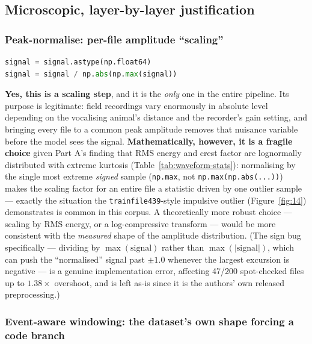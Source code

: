 \documentclass[11pt]{article}
\begin{document}
\subsection{Microscopic, layer-by-layer justification}
\label{sec:B3}

\subsubsection{Peak-normalise: per-file amplitude ``scaling''}
\label{sec:B31}

\begin{lstlisting}[language=Python]
signal = signal.astype(np.float64)
signal = signal / np.abs(np.max(signal))
\end{lstlisting}

\textbf{Yes, this is a scaling step}, and it is the \emph{only} one in the
entire pipeline. Its purpose is legitimate: field recordings vary enormously
in absolute level depending on the vocalising animal's distance and the
recorder's gain setting, and bringing every file to a common peak amplitude
removes that nuisance variable before the model sees the signal.
\textbf{Mathematically, however, it is a fragile choice} given Part A's
finding that RMS energy and crest factor are lognormally distributed with
extreme kurtosis (Table~\ref{tab:waveform-stats}): normalising by the single
most extreme \emph{signed} sample (\texttt{np.max}, not
\texttt{np.max(np.abs(...))}) makes the scaling factor for an entire file a
statistic driven by one outlier sample --- exactly the situation the
\texttt{trainfile439}-style impulsive outlier (Figure~\ref{fig:14})
demonstrates is common in this corpus. A theoretically more robust choice
--- scaling by RMS energy, or a log-compressive transform --- would be more
consistent with the \emph{measured} shape of the amplitude distribution.
(The sign bug specifically --- dividing by $\max(\text{signal})$ rather than
$\max(|\text{signal}|)$, which can push the ``normalised'' signal past
$\pm1.0$ whenever the largest excursion is negative --- is a genuine
implementation error, affecting 47/200 spot-checked files up to
$1.38\times$ overshoot, and is left as-is since it is the authors' own
released preprocessing.)

\subsubsection{Event-aware windowing: the dataset's own shape forcing a code branch}
\label{sec:B32}
\end{document}
